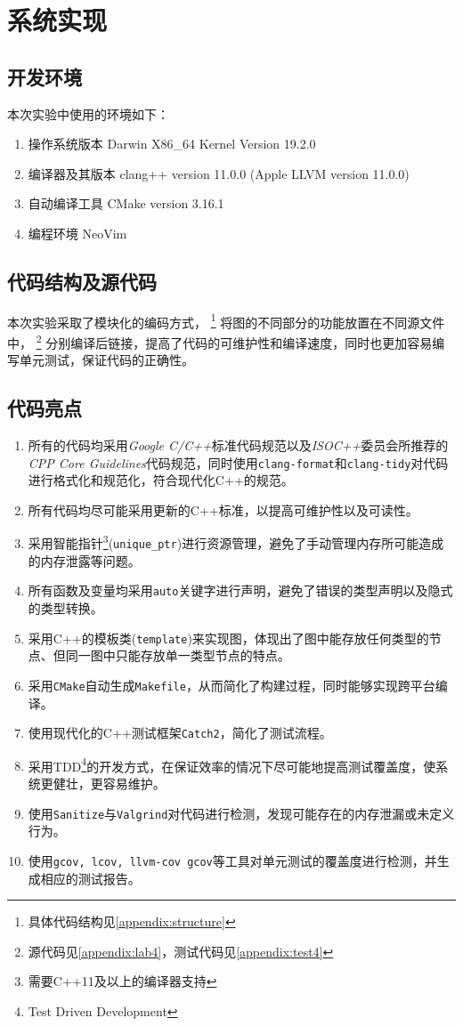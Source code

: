 \section{系统实现}
\subsection{开发环境}
本次实验中使用的环境如下：
\begin{enumerate}
    \item 操作系统版本 Darwin X86\_64 Kernel Version 19.2.0
    \item 编译器及其版本 clang++ version 11.0.0 (Apple LLVM version 11.0.0)
    \item 自动编译工具 CMake version 3.16.1
    \item 编程环境 NeoVim
\end{enumerate}
\subsection{代码结构及源代码}
本次实验采取了模块化的编码方式，
\footnote{具体代码结构见\autoref{appendix:structure}}
将图的不同部分的功能放置在不同源文件中，
\footnote{源代码见\autoref{appendix:lab4}，测试代码见\autoref{appendix:test4}}
分别编译后链接，提高了代码的可维护性和编译速度，同时也更加容易编写单元测试，保证代码的正确性。
\subsection{代码亮点}
\begin{enumerate}
        \item 所有的代码均采用\emph{Google
            C/C++}标准代码规范以及\emph{ISOC++}委员会所推荐的\emph{CPP Core Guidelines}代码规范，同时使用\texttt{clang-format}和\texttt{clang-tidy}对代码进行格式化和规范化，符合现代化C++的规范。
        \item 所有代码均尽可能采用更新的C++标准，以提高可维护性以及可读性。
        \item 采用智能指针\footnote{需要C++11及以上的编译器支持}(\texttt{unique\_ptr})进行资源管理，避免了手动管理内存所可能造成的内存泄露等问题。
        \item 所有函数及变量均采用\texttt{auto}关键字进行声明，避免了错误的类型声明以及隐式的类型转换。
        \item 采用C++的模板类(\texttt{template})来实现图，体现出了图中能存放任何类型的节点、但同一图中只能存放单一类型节点的特点。
        \item 采用\texttt{CMake}自动生成\texttt{Makefile}，从而简化了构建过程，同时能够实现跨平台编译。
        \item 使用现代化的C++测试框架\texttt{Catch2}，简化了测试流程。
        \item 采用TDD\footnote{Test Driven Development}的开发方式，在保证效率的情况下尽可能地提高测试覆盖度，使系统更健壮，更容易维护。
        \item 使用\texttt{Sanitize}与\texttt{Valgrind}对代码进行检测，发现可能存在的内存泄漏或未定义行为。
        \item 使用\texttt{gcov, lcov, llvm-cov gcov}等工具对单元测试的覆盖度进行检测，并生成相应的测试报告。
\end{enumerate}

